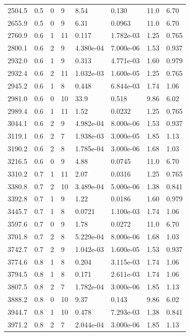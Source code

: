 \documentclass[preview]{standalone}
\begin{document}
{{{\begin{tabular}{L{1.2cm}C{1.2cm} C{0.3cm}C{0.5cm} C{1.4cm}C{1.4cm} C{1.4cm}C{1.4cm}}
  2504.5  &   0.5  & 0     &  9 &  8.54  & 0.130  & 11.0 &  6.70   \\ 
  2655.9  &   0.5  & 0     &  9 &  6.31  & 0.0963  & 11.0 &  6.70   \\ 
  2760.9  &   0.6  & 1     & 11 &  0.117  & 1.782e-03  & 1.25 &  0.765   \\ 
  2800.1  &   0.6  & 2     &  9 &  4.380e-04  & 7.000e-06  & 1.53 &  0.937   \\ 
  2932.0  &   0.6  & 1     &  9 &  0.313  & 4.771e-03  & 1.60 &  0.979   \\ 
  2932.4  &   0.6  & 2     & 11 &  1.032e-03  & 1.600e-05  & 1.25 &  0.765   \\ 
  2945.2  &   0.6  & 1     &  8 &  0.448  & 6.844e-03  & 1.74 &  1.06   \\ 
  2981.0  &   0.6  & 0     & 10 &  33.9  & 0.518  & 9.86 &  6.02   \\ 
  2989.4  &   0.6  & 1     & 11 &  1.52  & 0.0232  & 1.25 &  0.765   \\ 
  3044.1  &   0.6  & 2     &  9 &  4.982e-04  & 8.000e-06  & 1.53 &  0.937   \\ 
  3119.1  &   0.6  & 2     &  7 &  1.938e-03  & 3.000e-05  & 1.85 &  1.13   \\ 
  3190.2  &   0.6  & 2     &  8 &  1.785e-04  & 3.000e-06  & 1.68 &  1.03   \\ 
  3216.5  &   0.6  & 0     &  9 &  4.88  & 0.0745  & 11.0 &  6.70   \\ 
  3310.2  &   0.7  & 1     & 11 &  2.07  & 0.0316  & 1.25 &  0.765   \\ 
  3380.8  &   0.7  & 2     & 10 &  3.489e-04  & 5.000e-06  & 1.38 &  0.841   \\ 
  3392.8  &   0.7  & 1     &  9 &  1.22  & 0.0186  & 1.60 &  0.979   \\ 
  3445.7  &   0.7  & 1     &  8 &  0.0721  & 1.100e-03  & 1.74 &  1.06   \\ 
  3597.6  &   0.7  & 0     &  9 &  1.78  & 0.0272  & 11.0 &  6.70   \\ 
  3701.8  &   0.7  & 2     &  8 &  5.229e-04  & 8.000e-06  & 1.68 &  1.03   \\ 
  3742.7  &   0.7  & 2     &  9 &  1.042e-03  & 1.600e-05  & 1.53 &  0.937   \\ 
  3774.6  &   0.8  & 1     &  8 &  0.204  & 3.115e-03  & 1.74 &  1.06   \\ 
  3794.5  &   0.8  & 1     &  8 &  0.171  & 2.611e-03  & 1.74 &  1.06   \\ 
  3807.5  &   0.8  & 2     &  7 &  1.782e-04  & 3.000e-06  & 1.85 &  1.13   \\ 
  3888.2  &   0.8  & 0     & 10 &  9.37  & 0.143  & 9.86 &  6.02   \\ 
  3944.7  &   0.8  & 1     & 10 &  0.478  & 7.293e-03  & 1.38 &  0.841   \\ 
  3971.2  &   0.8  & 2     &  7 &  2.044e-04  & 3.000e-06  & 1.85 &  1.13   \\ 
\hline 
\end{tabular} 

}}}
\end{document}
